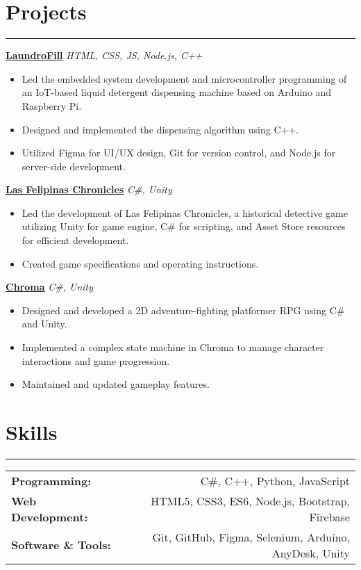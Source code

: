 \documentclass[a4paper, 10pt]{article}
\begin{document}
\vspace{-1em}

\section*{Projects}
\vspace{-1.5em}
\noindent\rule{\textwidth}{0.4pt}
\noindent \href{https://github.com/jancyrusm/display-laudrofill}{\textbf{LaundroFill}} \hfill \textit{HTML, CSS, JS, Node.js, C++}
\begin{itemize}[leftmargin=0.5in]
  \item Led the embedded system development and microcontroller programming of an IoT-based liquid detergent dispensing machine based on Arduino and Raspberry Pi.
  \item Designed and implemented the dispensing algorithm using C++.
  \item Utilized Figma for UI/UX design, Git for version control, and Node.js for server-side development.
\end{itemize}
\noindent \href{https://github.com/jancyrusm/mobile-dev-final-las-filipinas-chronicles}{\textbf{Las Felipinas Chronicles}} \hfill \textit{C\#, Unity}
\begin{itemize}[leftmargin=0.5in]
  \item Led the development of Las Felipinas Chronicles, a historical detective game utilizing Unity for game engine, C\# for scripting, and Asset Store resources for efficient development.
  \item Created game specifications and operating instructions.
\end{itemize}
\noindent \href{https://github.com/jancyrusm/game-dev-final-chroma}{\textbf{Chroma}} \hfill \textit{C\#, Unity}
\begin{itemize}[leftmargin=0.5in]
  \item Designed and developed a 2D adventure-fighting platformer RPG using C\# and Unity.
  \item Implemented a complex state machine in Chroma to manage character interactions and game progression.
  \item Maintained and updated gameplay features.
\end{itemize}

\vspace{-1em}

\section*{Skills}
\vspace{-1.5em}
\noindent\rule{\textwidth}{0.4pt}
\begin{tabularx}{\textwidth}{@{}X r@{}}
  \textbf{Programming:} & C\#, C++, Python, JavaScript                          \\
  \textbf{Web Development:} & HTML5, CSS3, ES6, Node.js, Bootstrap, Firebase   \\
  \textbf{Software \& Tools:}     & Git, GitHub, Figma, Selenium, Arduino, AnyDesk, Unity \\
\end{tabularx}
\end{document}
